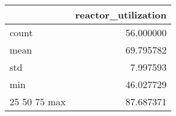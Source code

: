 \begin{tabular}{lr}
\toprule
 & reactor\_utilization \\
\midrule
count & 56.000000 \\
mean & 69.795782 \\
std & 7.997593 \\
min & 46.027729 \\
25%
50%
75%
max & 87.687371 \\
\bottomrule
\end{tabular}

